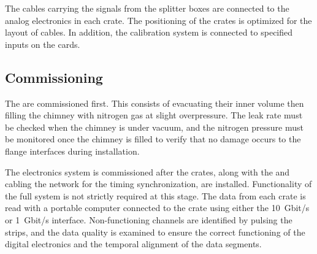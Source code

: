 The cables carrying the  signals from the splitter boxes are connected to the  analog electronics in each  crate. The positioning of the crates is optimized for the layout of  cables. In addition, the %
 calibration system is connected to specified inputs on the cards.


\subsection{Commissioning}
\label{ssec:dp-tpcelec-install-comission}

The  are commissioned first. %
This consists of evacuating their inner volume %
then filling the chimney with nitrogen gas at slight overpressure. The leak rate must be checked when the chimney is under vacuum, and the nitrogen pressure must be monitored once the chimney is filled to verify that no damage occurs to the flange interfaces during installation.

The electronics system is commissioned after the  crates, along with the  and cabling %
the  network for the timing synchronization, are installed. Functionality of the full  system is not strictly required at this stage. The data from each crate is read with a portable computer connected to the crate using either the  \SI{10}{Gbit/s} or \SI{1}{Gbit/s} interface. Non-functioning channels are identified by pulsing the  strips, and the data quality is examined to ensure the correct functioning of the digital electronics and the temporal alignment of the data segments.   
